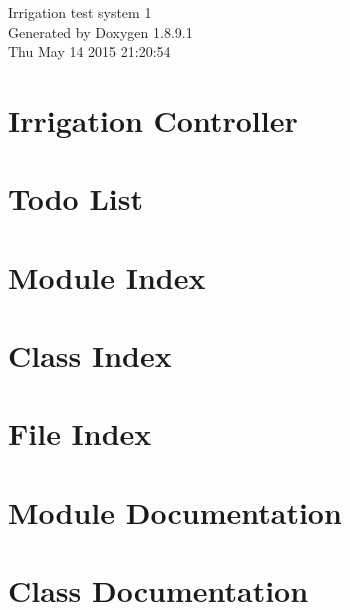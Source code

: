 \documentclass[twoside]{book}
\newcommand{\+}{\discretionary{\mbox{\scriptsize$\hookleftarrow$}}{}{}}
\newcommand{\clearemptydoublepage}{%
  \newpage{\pagestyle{empty}\cleardoublepage}%
}
\begin{document}
\hypersetup{pageanchor=false,
             bookmarks=true,
             bookmarksnumbered=true,
             pdfencoding=unicode
            }
\begin{titlepage}
\vspace*{7cm}
\begin{center}%
{\Large Irrigation test system 1 }\\
\vspace*{1cm}
{\large Generated by Doxygen 1.8.9.1}\\
\vspace*{0.5cm}
{\small Thu May 14 2015 21:20:54}\\
\end{center}
\end{titlepage}
\clearemptydoublepage
\tableofcontents
\clearemptydoublepage
{}
\hypersetup{pageanchor=true}

\chapter{Irrigation Controller}
\label{index}\hypertarget{index}{}
\chapter{Todo List}
\label{todo}
\hypertarget{todo}{}

\chapter{Module Index}

\chapter{Class Index}

\chapter{File Index}

\chapter{Module Documentation}




\chapter{Class Documentation}



























\end{document}

